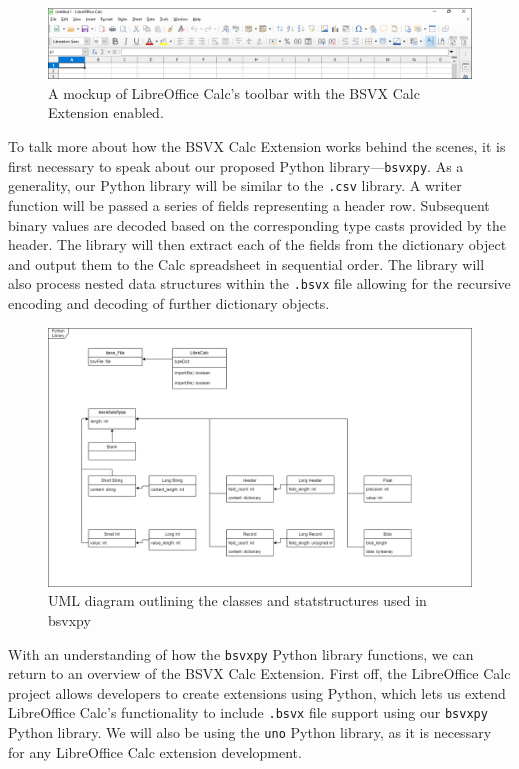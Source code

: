 \documentclass[10pt]{article}
\begin{document}
\begin{figure}[H]
\centering
\includegraphics[width=\textwidth]{figures/mockupPart3.png}
\caption{A mockup of LibreOffice Calc's toolbar with the BSVX Calc Extension enabled.}
\label{fig:deliverables_mockupPart3}
\end{figure}

\indent{}
To talk more about how the BSVX Calc Extension works behind the scenes, it is first necessary to speak about our proposed Python library---\texttt{bsvxpy}.
As a generality, our Python library will be similar to the \texttt{.csv} library.
A writer function will be passed a series of fields representing a header row. 
Subsequent binary values are decoded based on the corresponding type casts provided by the header.
The library will then extract each of the fields from the dictionary object and output them to the Calc spreadsheet in sequential order.
The library will also process nested data structures within the \texttt{.bsvx} file allowing for the recursive encoding and decoding of further dictionary objects.

\begin{figure}[H]
\centering
\includegraphics[width=\textwidth]{figures/bsvxpy.png}
\caption{UML diagram outlining the classes and statstructures used in bsvxpy}
\label{fig:bsvxpy_architecture}
\end{figure}


\indent{}
With an understanding of how the \texttt{bsvxpy} Python library functions, we can return to an overview of the BSVX Calc Extension.
First off, the LibreOffice Calc project allows developers to create extensions using Python, which lets us extend LibreOffice Calc’s functionality to include \texttt{.bsvx} file support using our \texttt{bsvxpy} Python library.
We will also be using the \texttt{uno} Python library, as it is necessary for any LibreOffice Calc extension development.
\end{document}
